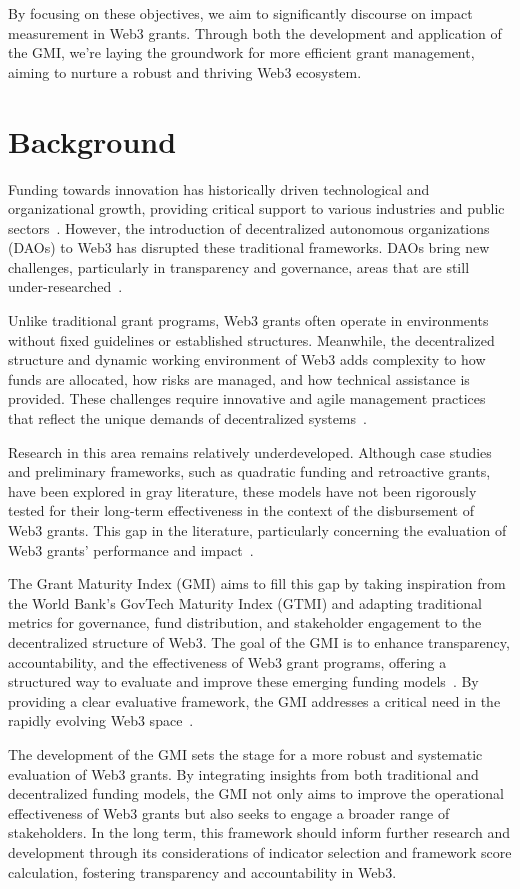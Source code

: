 \documentclass[a4,10pt]{article}
\begin{document}
By focusing on these objectives, we aim to significantly discourse on impact measurement in Web3 grants. Through both the development and application of the GMI, we're laying the groundwork for more efficient grant management, aiming to nurture a robust and thriving Web3 ecosystem.

\section{Background}\label{sec_4}
Funding towards innovation has historically driven technological and organizational growth, providing critical support to various industries and public sectors~\cite{4,5}. However, the introduction of decentralized autonomous organizations (DAOs) to Web3 has disrupted these traditional frameworks. DAOs bring new challenges, particularly in transparency and governance, areas that are still under-researched~\cite{1,6}.

Unlike traditional grant programs, Web3 grants often operate in environments without fixed guidelines or established structures. Meanwhile, the decentralized structure and dynamic working environment of Web3 adds complexity to how funds are allocated, how risks are managed, and how technical assistance is provided. These challenges require innovative and agile management practices that reflect the unique demands of decentralized systems~\cite{7,8}.

Research in this area remains relatively underdeveloped. Although case studies and preliminary frameworks, such as quadratic funding and retroactive grants, have been explored in gray literature, these models have not been rigorously tested for their long-term effectiveness in the context of the disbursement of Web3 grants. This gap in the literature, particularly concerning the evaluation of Web3 grants’ performance and impact~\cite{9}.

The Grant Maturity Index (GMI) aims to fill this gap by taking inspiration from the World Bank’s GovTech Maturity Index (GTMI) and adapting traditional metrics for governance, fund distribution, and stakeholder engagement to the decentralized structure of Web3. The goal of the GMI is to enhance transparency, accountability, and the effectiveness of Web3 grant programs, offering a structured way to evaluate and improve these emerging funding models~\cite{3}. By providing a clear evaluative framework, the GMI addresses a critical need in the rapidly evolving Web3 space~\cite{7,10}.

The development of the GMI sets the stage for a more robust and systematic evaluation of Web3 grants. By integrating insights from both traditional and decentralized funding models, the GMI not only aims to improve the operational effectiveness of Web3 grants but also seeks to engage a broader range of stakeholders. In the long term, this framework should inform further research and development through its considerations of indicator selection and framework score calculation, fostering transparency and accountability in Web3.
\end{document}
